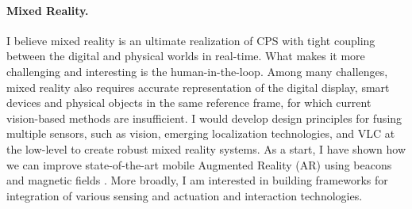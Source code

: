 \documentclass[10pt]{article}
\begin{document}

\paragraph{Mixed Reality. }
I believe mixed reality is an ultimate realization of CPS with tight coupling between the digital and physical worlds in real-time. What makes it more challenging and interesting is the human-in-the-loop. 
Among many challenges, mixed reality also requires accurate representation of the digital display, smart devices and physical objects in the same reference frame, for which current vision-based methods are insufficient. I would develop design principles for fusing multiple sensors, such as vision, emerging localization technologies, and VLC at the low-level to create robust mixed reality systems. As a start, I have shown how we can improve state-of-the-art mobile Augmented Reality (AR) using beacons and magnetic fields \cite{mobileAR}. More broadly, I am interested in building frameworks for integration of various sensing and actuation and interaction technologies. 
\end{document}
